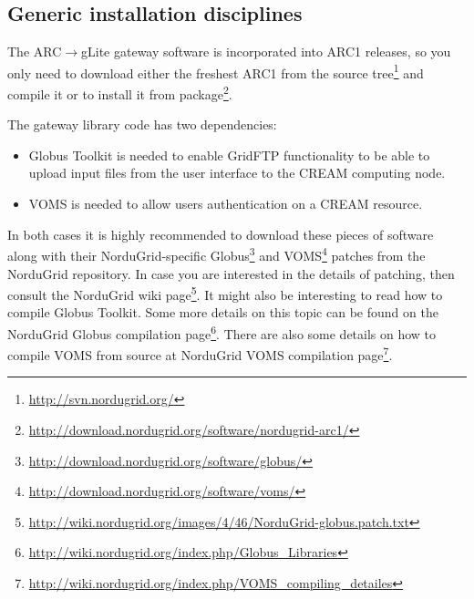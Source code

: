 \documentclass{article}
\begin{document}
\subsection{Generic installation disciplines}
\label{Building}
The ARC$\rightarrow$gLite gateway software is incorporated into ARC1 releases, so you only need to download either the freshest ARC1 from the source tree\footnote{\url{http://svn.nordugrid.org/}} and compile it or to install it from package\footnote{\url{http://download.nordugrid.org/software/nordugrid-arc1/}}.\par
The gateway library code has two dependencies:
\begin{itemize}
\item Globus Toolkit is needed to enable GridFTP functionality to be able to upload input files from the user interface to the CREAM computing node.
\item VOMS is needed to allow users authentication on a CREAM resource.
\end{itemize}
In both cases it is highly recommended to download these pieces of software along with their NorduGrid-specific Globus\footnote{\url{http://download.nordugrid.org/software/globus/}} and VOMS\footnote{\url{http://download.nordugrid.org/software/voms/}} patches from the NorduGrid repository. In case you are interested in the details of patching, then consult the NorduGrid wiki page\footnote{\url{http://wiki.nordugrid.org/images/4/46/NorduGrid-globus.patch.txt}}. It might also be interesting to read how to compile Globus Toolkit. Some more details on this topic can be found on the NorduGrid Globus compilation page\footnote{\url{http://wiki.nordugrid.org/index.php/Globus\_Libraries}}. There are also some details on how to compile VOMS from source at NorduGrid VOMS compilation page\footnote{\url{http://wiki.nordugrid.org/index.php/VOMS\_compiling\_detailes}}.
\end{document}
